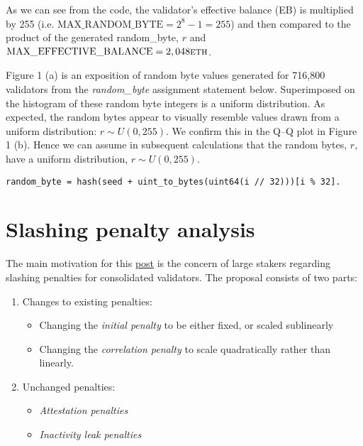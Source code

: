\documentclass{article}
\begin{document}
As we can see from the code, the validator’s effective balance (EB) is
multiplied by 255 (i.e.  $\text{MAX\_RANDOM\_BYTE} = 2^8 - 1 = 255$) and then
compared to the product of the generated random\_byte, $r$ and 
$\text{MAX\_EFFECTIVE\_BALANCE} = 2,048 \textsc{eth}$.

Figure 1 (a) is an exposition of random byte values generated for 716,800
validators from the \emph{random\_byte} assignment statement below.
Superimposed on the histogram of these random byte integers is a uniform
distribution. As expected, the random bytes appear to visually resemble values
drawn from a uniform distribution: $r \sim U(0,255)$. We confirm this in the
Q–Q plot in Figure 1 (b). Hence we can assume in subsequent calculations that
the random bytes, $r$, have a uniform distribution, $r \sim U(0,255)$.

\begin{lstlisting}
random_byte = hash(seed + uint_to_bytes(uint64(i // 32)))[i % 32].
\end{lstlisting}

\section{Slashing penalty analysis}
The main motivation for this
\href{https://notes.ethereum.org/@mikeneuder/slashings-eip-7251}{post} is the
concern of large stakers regarding slashing penalties for consolidated
validators. The proposal consists of two parts:
\begin{enumerate}
  \item Changes to existing penalties:
    \begin{itemize}
      \item Changing the \textit{initial penalty} to be either fixed, or scaled
        sublinearly
      \item Changing the \textit{correlation penalty} to scale quadratically
        rather than linearly.
    \end{itemize}
  \item Unchanged penalties:
    \begin{itemize}
      \item \textit{Attestation penalties}
      \item \textit{Inactivity leak penalties}
    \end{itemize}
\end{enumerate}
\end{document}
